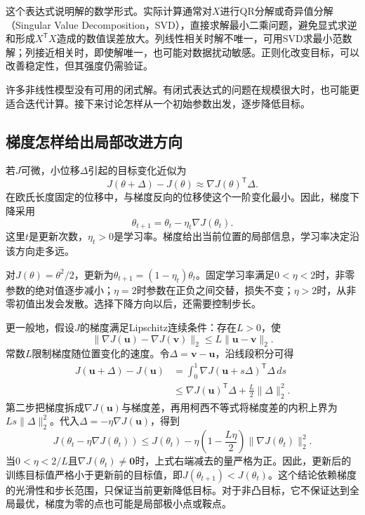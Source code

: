 这个表达式说明解的数学形式。实际计算通常对$X$进行QR分解或奇异值分解（Singular Value Decomposition，SVD），直接求解最小二乘问题，避免显式求逆和形成$X^{\mathsf T}X$造成的数值误差放大。列线性相关时解不唯一，可用SVD求最小范数解；列接近相关时，即使解唯一，也可能对数据扰动敏感。正则化改变目标，可以改善稳定性，但其强度仍需验证。

许多非线性模型没有可用的闭式解。有闭式表达式的问题在规模很大时，也可能更适合迭代计算。接下来讨论怎样从一个初始参数出发，逐步降低目标。

\subsection{梯度怎样给出局部改进方向}
若$J$可微，小位移$\Delta$引起的目标变化近似为
\begin{equation}
 J(\theta+\Delta)-J(\theta)\approx\nabla J(\theta)^{\mathsf T}\Delta.
\end{equation}
在欧氏长度固定的位移中，与梯度反向的位移使这个一阶变化最小。因此，梯度下降采用
\begin{equation}
 \theta_{t+1}=\theta_t-\eta_t\nabla J(\theta_t).
 \label{eq:solving-gradient-descent}
\end{equation}
这里$t$是更新次数，$\eta_t>0$是学习率。梯度给出当前位置的局部信息，学习率决定沿该方向走多远。

对$J(\theta)=\theta^2/2$，更新为$\theta_{t+1}=(1-\eta_t)\theta_t$。固定学习率满足$0<\eta<2$时，非零参数的绝对值逐步减小；$\eta=2$时参数在正负之间交替，损失不变；$\eta>2$时，从非零初值出发会发散。选择下降方向以后，还需要控制步长。

更一般地，假设$J$的梯度满足Lipschitz连续条件：存在$L>0$，使
\begin{equation}
 \|\nabla J(\bm u)-\nabla J(\bm v)\|_2\leq L\|\bm u-\bm v\|_2.
\end{equation}
常数$L$限制梯度随位置变化的速度。令$\Delta=\bm v-\bm u$，沿线段积分可得
\begin{align}
 J(\bm u+\Delta)-J(\bm u)
 &=\int_0^1\nabla J(\bm u+s\Delta)^{\mathsf T}\Delta\,ds\\
 &\leq\nabla J(\bm u)^{\mathsf T}\Delta+\frac L2\|\Delta\|_2^2.
\end{align}
第二步把梯度拆成$\nabla J(\bm u)$与梯度差，再用柯西不等式将梯度差的内积上界为$Ls\|\Delta\|_2^2$。代入$\Delta=-\eta\nabla J(\bm u)$，得到
\begin{equation}
 J(\theta_t-\eta\nabla J(\theta_t))
 \leq J(\theta_t)-\eta\left(1-\frac{L\eta}{2}\right)\|\nabla J(\theta_t)\|_2^2.
 \label{eq:solving-descent-bound}
\end{equation}
当$0<\eta<2/L$且$\nabla J(\theta_t)\ne\bm0$时，上式右端减去的量严格为正。因此，更新后的训练目标值严格小于更新前的目标值，即$J(\theta_{t+1})<J(\theta_t)$。这个结论依赖梯度的光滑性和步长范围，只保证当前更新降低目标。对于非凸目标，它不保证达到全局最优，梯度为零的点也可能是局部极小点或鞍点。

